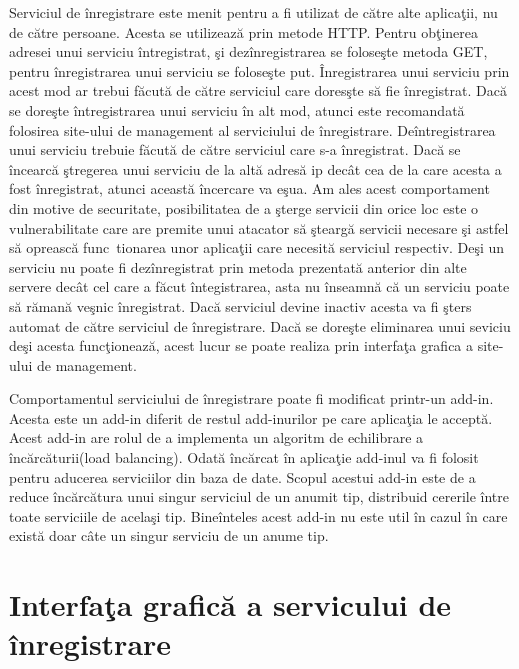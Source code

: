 \documentclass[a4paper,12pt]{report}
\begin{document}
Serviciul de \^inregistrare este menit pentru a fi utilizat de c\u atre alte aplica\c tii, nu de c\u atre persoane.
Acesta se utilizeaz\u a prin metode HTTP. Pentru ob\c tinerea adresei unui serviciu \^intregistrat, \c si dez\^inregistrarea
 se folose\c ste metoda GET, pentru \^inregistrarea unui serviciu se folose\c ste put.
\^Inregistrarea unui serviciu prin acest mod ar trebui f\u acut\u a de c\u atre serviciul care dores\c ste 
s\u a fie \^inregistrat. Dac\u a se dore\c ste \^intregistrarea unui serviciu \^in alt mod, atunci este recomandat\u a 
folosirea site-ului de management al serviciului de \^inregistrare.
De\^intregistrarea unui serviciu trebuie f\u acut\u a de c\u atre serviciul care s-a \^inregistrat. Dac\u a 
se \^incearc\u a \c stregerea unui serviciu de la alt\u a adres\u a ip dec\^at cea de la care acesta a fost \^inregistrat,
atunci aceast\u a \^incercare va e\c sua. Am ales acest comportament din motive de securitate, posibilitatea de 
a \c sterge servicii din orice loc este o vulnerabilitate care are premite unui atacator s\u a \c stearg\u a 
servicii necesare \c si astfel s\u a opreasc\u a func\ tionarea unor aplica\c tii care necesit\u a serviciul respectiv.
De\c si un serviciu nu poate fi dez\^inregistrat prin metoda prezentat\u a anterior din alte servere dec\^at cel care a 
f\u acut \^integistrarea, asta nu \^inseamn\u a c\u a un serviciu poate s\u a r\u aman\u a ve\c snic \^inregistrat.
Dac\u a serviciul devine inactiv acesta va fi \c sters automat de c\u atre serviciul de \^inregistrare.
Dac\u a se dore\c ste eliminarea unui seviciu de\c si acesta func\c tioneaz\u a, acest lucur se poate realiza prin 
interfa\c ta grafica a site-ului de management.  

Comportamentul serviciului de \^inregistrare poate fi modificat printr-un add-in.
Acesta este un add-in diferit de restul add-inurilor pe care aplica\c tia le accept\u a.
Acest add-in are rolul de a implementa un algoritm de echilibrare a \^inc\u arc\u aturii(load balancing).
Odat\u a \^inc\u arcat \^in aplica\c tie add-inul va fi folosit pentru aducerea serviciilor din
baza de date. Scopul acestui add-in este de a reduce \^inc\u arc\u atura unui singur 
serviciul de un anumit tip, distribuid cererile \^intre toate serviciile de acela\c si tip.
Bine\^inteles acest add-in nu este util \^in cazul \^in care exist\u a doar c\^ate un singur 
serviciu de un anume tip.

\section{Interfa\c ta grafic\u a a servicului de \^inregistrare}
\end{document}
